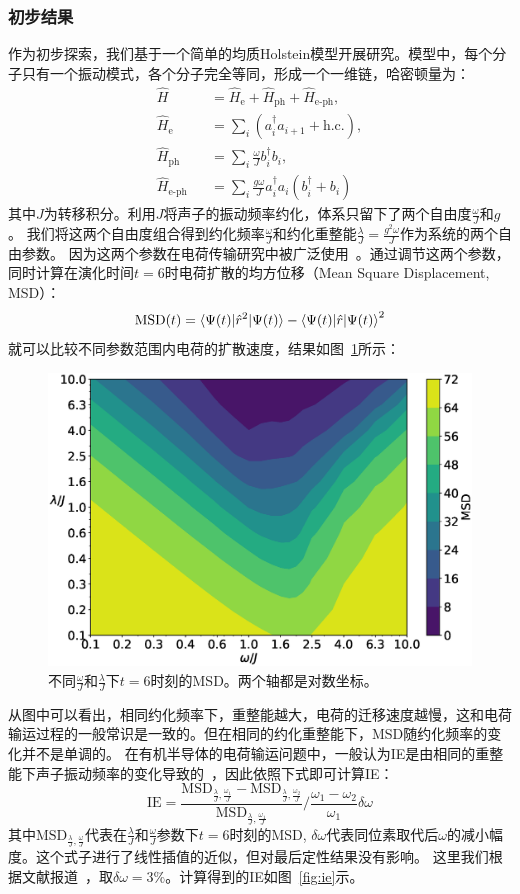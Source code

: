 \documentclass{article}
\newcommand{\He}{{\hat H}_{\text{e}}}
\newcommand{\Hph}{{\hat H}_{\text{ph}}}
\newcommand{\Heph}{{\hat H}_{\text{e-ph}}}
\begin{document}
\subsubsection{初步结果}
作为初步探索，我们基于一个简单的均质Holstein模型开展研究。模型中，每个分子只有一个振动模式，各个分子完全等同，形成一个一维链，哈密顿量为：
\begin{eqnarray}
	\label{eq:hamil}
	\hat H && =	\He + \Hph + \Heph,  \\
	\label{eq:he}
	\He && = \sum_{i} \left(a_i^\dagger a_{i+1} + \text{h.c.}\right),  \\
	\label{eq:hph}
	\Hph && = \sum_{i} \frac{\omega}{J} b_{i}^\dagger b_{i}, \\
	\label{eq:heph}
	\Heph && = \sum_{i} \frac{g\omega}{J} a_i^\dagger a_i
	(b_{i}^\dagger + b_{i})
\end{eqnarray}
其中$J$为转移积分。利用$J$将声子的振动频率约化，体系只留下了两个自由度$\frac{\omega}{J}$和$g$。
我们将这两个自由度组合得到约化频率$\frac{\omega}{J}$和约化重整能$\frac{\lambda}{J} = \frac{g^2 \omega}{J}$作为系统的两个自由参数。
因为这两个参数在电荷传输研究中被广泛使用~\cite{SHUAI12}。通过调节这两个参数，同时计算在演化时间$t=6$时电荷扩散的均方位移（Mean Square Displacement, MSD）：
$$
\text{MSD}(t) = \braket{\Psi(t)|\hat {r}^2|\Psi(t)} - \braket{\Psi(t)|\hat r|\Psi(t)} ^ 2
$$
就可以比较不同参数范围内电荷的扩散速度，结果如图~\ref{fig:msd}所示：
\begin{figure}[ht]
    \centering
	\includegraphics[width=.6\linewidth]{msd}
	\caption{\label{fig:msd}不同$\frac{\omega}{J}$和$\frac{\lambda}{J}$下$t=6$时刻的MSD。两个轴都是对数坐标。}
\end{figure}

从图中可以看出，相同约化频率下，重整能越大，电荷的迁移速度越慢，这和电荷输运过程的一般常识是一致的。但在相同的约化重整能下，MSD随约化频率的变化并不是单调的。
在有机半导体的电荷输运问题中，一般认为IE是由相同的重整能下声子振动频率的变化导致的~\cite{Ren17, Jiang15, Shao14}，因此依照下式即可计算IE：
\begin{equation}
    \newcommand{\MSDa}{\text{MSD}_{\frac{\lambda}{J}, \frac{\omega_1}{J}}}
    \newcommand{\MSDb}{\text{MSD}_{\frac{\lambda}{J}, \frac{\omega_2}{J}}}
    \text{IE} = \frac{ \MSDa- \MSDb}{\MSDa} \bigg / \frac{\omega_1- \omega_2}{\omega_1}  \delta \omega
\end{equation}
其中$\text{MSD}_{\frac{\lambda}{J}, \frac{\omega}{J}}$代表在$\frac{\lambda}{J}$和$\frac{\omega}{J}$参数下$t=6$时刻的MSD, 
$\delta \omega$代表同位素取代后$\omega$的减小幅度。这个式子进行了线性插值的近似，但对最后定性结果没有影响。
这里我们根据文献报道~\cite{Ren17, Jiang15}，取$\delta \omega = 3\%$。计算得到的IE如图~\ref{fig:ie}示。
\end{document}
